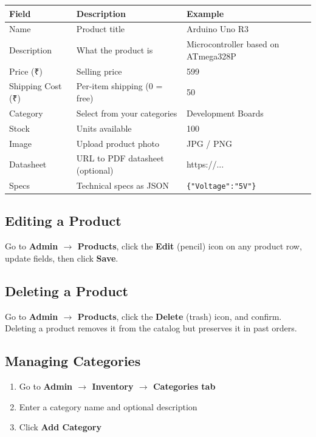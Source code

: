 \documentclass[12pt,a4paper]{article}
\begin{document}
\begin{tabular}{@{}L{3.5cm} L{6cm} L{3.5cm}@{}}
\toprule
\textbf{Field} & \textbf{Description} & \textbf{Example} \\
\midrule
Name & Product title & Arduino Uno R3 \\[4pt]
Description & What the product is & Microcontroller based on ATmega328P \\[4pt]
Price (₹) & Selling price & 599 \\[4pt]
Shipping Cost (₹) & Per-item shipping (0 = free) & 50 \\[4pt]
Category & Select from your categories & Development Boards \\[4pt]
Stock & Units available & 100 \\[4pt]
Image & Upload product photo & JPG / PNG \\[4pt]
Datasheet & URL to PDF datasheet (optional) & https://... \\[4pt]
Specs & Technical specs as JSON & \texttt{\{"Voltage":"5V"\}} \\
\bottomrule
\end{tabular}

\subsection{Editing a Product}

Go to \textbf{Admin $\rightarrow$ Products}, click the \textbf{Edit} (pencil) icon on any product row, update fields, then click \textbf{Save}.

\subsection{Deleting a Product}

Go to \textbf{Admin $\rightarrow$ Products}, click the \textbf{Delete} (trash) icon, and confirm. Deleting a product removes it from the catalog but preserves it in past orders.

\subsection{Managing Categories}

\begin{enumerate}[leftmargin=2em, itemsep=4pt]
  \item Go to \textbf{Admin $\rightarrow$ Inventory $\rightarrow$ Categories tab}
  \item Enter a category name and optional description
  \item Click \textbf{Add Category}
\end{enumerate}
\end{document}
